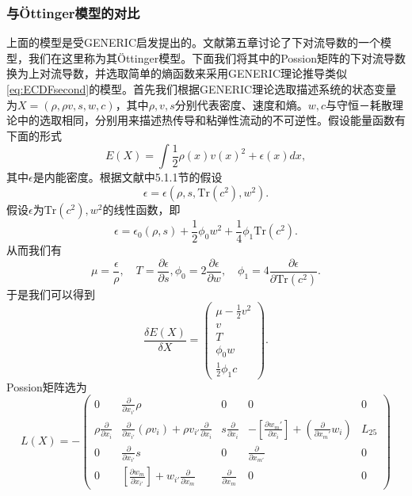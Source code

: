 	\subsubsection{与\"Ottinger模型的对比}
	上面的模型是受GENERIC启发提出的。文献\cite{ottinger2005beyond}第五章讨论了下对流导数的一个模型，我们在这里称为其\"Ottinger模型。下面我们将其中的Possion矩阵的下对流导数换为上对流导数，并选取简单的熵函数来采用GENERIC理论推导类似\eqref{eq:ECDFsecond}的模型。首先我们根据GENERIC理论选取描述系统的状态变量为$X=(\rho,\rho v, s ,w ,c)$，其中$\rho,v,s$分别代表密度、速度和熵。$w,c$与守恒－耗散理论中的选取相同，分别用来描述热传导和粘弹性流动的不可逆性。假设能量函数有下面的形式
	\begin{equation*}
		E(X) =	\int \frac{1}{2} \rho(x) v(x)^2 + \epsilon(x) dx,
	\end{equation*}
	其中$\epsilon$是内能密度。根据文献\cite{ottinger2005beyond}中5.1.1节的假设
	\begin{equation*}
		\epsilon = \epsilon (\rho,s,\mbox{Tr}(c^2),w^2) .
	\end{equation*}
	假设$\epsilon$为$\mbox{Tr}(c^2),w^2$的线性函数，即
	\begin{equation*}
		\epsilon = \epsilon_0(\rho,s) + \frac{1}{2} \phi_0 w^2  + \frac{1}{4} \phi_1 \mbox{Tr}(c^2) .
	\end{equation*}
	从而我们有
	\begin{equation*}
		\mu = \frac{\epsilon}{\rho},\quad T = \frac{\partial \epsilon}{\partial s}, \phi_0 = 2 \frac{\partial \epsilon}{\partial w}, \quad \phi_1 = 4 \frac{\partial \epsilon}{\partial \mbox{Tr}(c^2)}.
	\end{equation*}
	于是我们可以得到
	\begin{equation*}
		\frac{\delta E(X)}{ \delta X} = \left( \begin{array}{c} \mu - \frac{1}{2} v^2 \\ v \\ T \\ \phi_0 w \\ \frac{1}{2} \phi_1 c \end{array} \right).
	\end{equation*}
	Possion矩阵选为
	\begin{equation*}
		L(X) = -\left( \begin{array}{ccccc}
		0 & \frac{\partial}{\partial {x_{i'}}} \rho & 0 & 0 & 0 \\
		\rho \frac{\partial}{\partial {x_i}} & \frac{\partial}{\partial {x_{i'}}} ({\rho v_i}) + \rho v_{i'} \frac{\partial}{\partial {x_i}} & s \frac{\partial}{\partial {x_i}} & -[\frac{\partial w_m'}{\partial x_i}] + (\frac{\partial}{\partial {x_m'}} w_i) & L_{25} \\
		0 &　\frac{\partial}{\partial x_{i'}} s & 0 & \frac{\partial }{\partial x_{m'}} & 0 \\
		0 & [\frac{\partial w_m}{\partial x_{i'}}] + w_{i'} \frac{\partial}{\partial x_{m}} & \frac{\partial}{\partial {x_m}} & 0 & 0 　
		\end{array}\right)
	\end{equation*}
